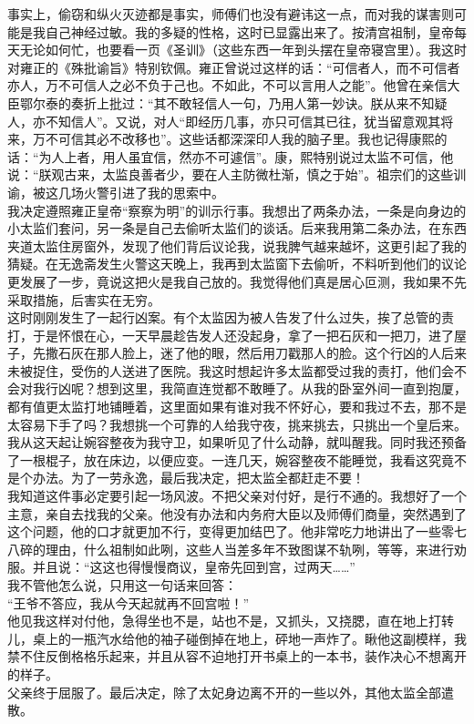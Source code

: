 事实上，偷窃和纵火灭迹都是事实，师傅们也没有避讳这一点，而对我的谋害则可能是我自己神经过敏。我的多疑的性格，这时已显露出来了。按清宫祖制，皇帝每天无论如何忙，也要看一页《圣训》（这些东西一年到头摆在皇帝寝宫里）。我这时对雍正的《殊批谕旨》特别钦佩。雍正曾说过这样的话：“可信者人，而不可信者亦人，万不可信人之必不负于己也。不如此，不可以言用人之能”。他曾在亲信大臣鄂尔泰的奏折上批过：“其不敢轻信人一句，乃用人第一妙诀。朕从来不知疑人，亦不知信人”。又说，对人“即经历几事，亦只可信其已往，犹当留意观其将来，万不可信其必不改移也”。这些话都深深印人我的脑子里。我也记得康熙的话：“为人上者，用人虽宜信，然亦不可遽信”。康，熙特别说过太监不可信，他说：“朕观古来，太监良善者少，要在人主防微杜渐，慎之于始”。祖宗们的这些训谕，被这几场火警引进了我的思索中。\\

我决定遵照雍正皇帝“察察为明”的训示行事。我想出了两条办法，一条是向身边的小太监们套问，另一条是自己去偷听太监们的谈话。后来我用第二条办法，在东西夹道太监住房窗外，发现了他们背后议论我，说我脾气越来越坏，这更引起了我的猜疑。在无逸斋发生火警这天晚上，我再到太监窗下去偷听，不料听到他们的议论更发展了一步，竟说这把火是我自己放的。我觉得他们真是居心叵测，我如果不先采取措施，后害实在无穷。\\

这时刚刚发生了一起行凶案。有个太监因为被人告发了什么过失，挨了总管的责打，于是怀恨在心，一天早晨趁告发人还没起身，拿了一把石灰和一把刀，进了屋子，先撒石灰在那人脸上，迷了他的眼，然后用刀戳那人的脸。这个行凶的人后来未被捉住，受伤的人送进了医院。我这时想起许多太监都受过我的责打，他们会不会对我行凶呢？想到这里，我简直连觉都不敢睡了。从我的卧室外间一直到抱厦，都有值更太监打地铺睡着，这里面如果有谁对我不怀好心，要和我过不去，那不是太容易下手了吗？我想挑一个可靠的人给我守夜，挑来挑去，只挑出一个皇后来。我从这天起让婉容整夜为我守卫，如果听见了什么动静，就叫醒我。同时我还预备了一根棍子，放在床边，以便应变。一连几天，婉容整夜不能睡觉，我看这究竟不是个办法。为了一劳永逸，最后我决定，把太监全都赶走不要！\\

我知道这件事必定要引起一场风波。不把父亲对付好，是行不通的。我想好了一个主意，亲自去找我的父亲。他没有办法和内务府大臣以及师傅们商量，突然遇到了这个问题，他的口才就更加不行，变得更加结巴了。他非常吃力地讲出了一些零七八碎的理由，什么祖制如此咧，这些人当差多年不致图谋不轨咧，等等，来进行劝服。并且说：“这这也得慢慢商议，皇帝先回到宫，过两天……”\\

我不管他怎么说，只用这一句话来回答：\\

“王爷不答应，我从今天起就再不回宫啦！”\\

他见我这样对付他，急得坐也不是，站也不是，又抓头，又挠腮，直在地上打转儿，桌上的一瓶汽水给他的袖子碰倒掉在地上，砰地一声炸了。瞅他这副模样，我禁不住反倒格格乐起来，并且从容不迫地打开书桌上的一本书，装作决心不想离开的样子。\\

父亲终于屈服了。最后决定，除了太妃身边离不开的一些以外，其他太监全部遣散。\\